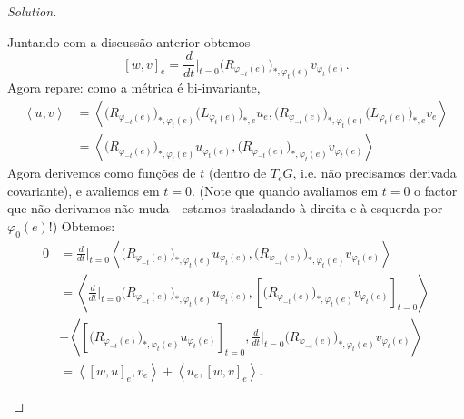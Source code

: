 \begin{proof}[Solution]
\begin{enumerate}[label=(\alph*)]
Juntando com a discussão anterior obtemos
\[[w,v]_e=\frac{d}{dt}\Big|_{t=0}\Big(R_{\varphi_{-t}(e)}\Big)_{*,\varphi_t(e)}v_{\varphi_t(e)}.\]
Agora repare: como a métrica é bi-invariante,
\begin{align*}
\left<u,v\right>&=\left<\Big(R_{\varphi_{-t}(e)}\Big)_{*,\varphi_t(e)}\Big(L_{\varphi_{t}(e)}\Big)_{*,e}u_{e},\Big(R_{\varphi_{-t}(e)}\Big)_{*,\varphi_t(e)}\Big(L_{\varphi_{t}(e)}\Big)_{*,e}v_{e}\right>\\
&=\left<\Big(R_{\varphi_{-t}(e)}\Big)_{*,\varphi_t(e)}u_{\varphi_t(e)},\Big(R_{\varphi_{-t}(e)}\Big)_{*,\varphi_t(e)}v_{\varphi_t(e)}\right>
\end{align*}
Agora derivemos como funções de \(t\) (dentro de \(T_eG\), i.e. não precisamos derivada covariante), e avaliemos em  \(t=0\). (Note que quando avaliamos em  \(t=0\) o factor que não derivamos não muda---estamos trasladando à direita e à esquerda por \(\varphi_0(e)\)!) Obtemos:
\begin{align*}
0&=\frac{d}{dt}\Big|_{t=0}\left<\Big(R_{\varphi_{-t}(e)}\Big)_{*,\varphi_t(e)}u_{\varphi_t(e)},\Big(R_{\varphi_{-t}(e)}\Big)_{*,\varphi_t(e)}v_{\varphi_t(e)}\right>\\
 &=\left<\frac{d}{dt}\Big|_{t=0}\Big(R_{\varphi_{-t}(e)}\Big)_{*,\varphi_t(e)}u_{\varphi_t(e)},\left[\Big(R_{\varphi_{-t}(e)}\Big)_{*,\varphi_t(e)}v_{\varphi_t(e)}\right]_{t=0}\right>\\
&+\left<\left[\Big(R_{\varphi_{-t}(e)}\Big)_{*,\varphi_t(e)}u_{\varphi_t(e)}\right]_{t=0},\frac{d}{dt}\Big|_{t=0}\Big(R_{\varphi_{-t}(e)}\Big)_{*,\varphi_t(e)}v_{\varphi_t(e)}\right>\\
&=\left<[w,u]_e,v_e\right>+\left<u_e,[w,v]_e\right>.
\end{align*}
\end{enumerate}


\end{proof}
